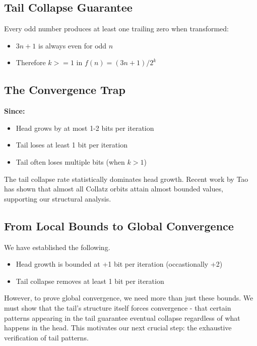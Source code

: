 \documentclass[10pt,letterpaper]{article}
\begin{document}
\subsection{Tail Collapse Guarantee}

Every odd number produces at least one trailing zero when transformed:

\begin{itemize}
    \item $3n+1$ is always even for odd $n$
    \item Therefore $k >= 1$ in $f(n) = (3n + 1)/2^k$
\end{itemize}


\subsection{The Convergence Trap}

\textbf{Since:}

\begin{itemize}
    \item Head grows by at most 1-2 bits per iteration
    \item Tail loses at least 1 bit per iteration
    \item Tail often loses multiple bits (when $k>1$)
\end{itemize}

The tail collapse rate statistically dominates head growth. Recent work by Tao \cite{Tao2019} has shown that almost all Collatz orbits attain almost bounded values, supporting our structural analysis.

\subsection{From Local Bounds to Global Convergence}
We have established the following.
\begin{itemize}
    \item Head growth is bounded at +1 bit per iteration (occastionally +2)
    \item Tail collapse removes at least 1 bit per iteration
\end{itemize}

However, to prove global convergence, we need more than just these bounds. We must show that the tail's structure itself forces convergence - that certain patterns appearing in the tail guarantee eventual collapse regardless of what happens in the head. This motivates our next crucial step: the exhaustive verification of tail patterns.
\end{document}
